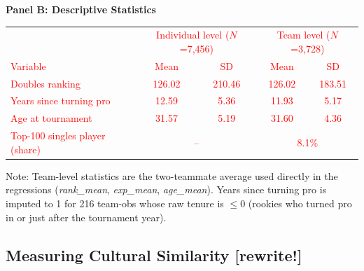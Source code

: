 \documentclass[10pt]{article}
\begin{document}
\begin{table}[h!]
\begin{threeparttable}
\vspace{10pt}
\textbf{Panel B: Descriptive Statistics}\\[2pt]
\textcolor{red}{
\begin{tabular}{lcccc}
\toprule
 & \multicolumn{2}{c}{Individual level ($N$=7,456)} & \multicolumn{2}{c}{Team level ($N$=3,728)} \\
Variable & Mean & SD & Mean & SD \\
\midrule
Doubles ranking            & 126.02 & 210.46 & 126.02 & 183.51 \\
Years since turning pro    & 12.59  & 5.36   & 11.93  & 5.17   \\
Age at tournament          & 31.57  & 5.19   & 31.60  & 4.36   \\
Top-100 singles player (share) & \multicolumn{2}{c}{--} & \multicolumn{2}{c}{8.1\%} \\
\bottomrule
\end{tabular}
}
\begin{tablenotes}
\small
\item Note: %
Team-level statistics are the two-teammate average used directly in the regressions (\textit{rank\_mean}, \textit{exp\_mean}, \textit{age\_mean}). Years since turning pro is imputed to 1 for 216 team-obs whose raw tenure is $\le 0$ (rookies who turned pro in or just after the tournament year). %
\end{tablenotes}
\end{threeparttable}
\end{table}



\subsection{Measuring Cultural Similarity [rewrite!]}
\end{document}
